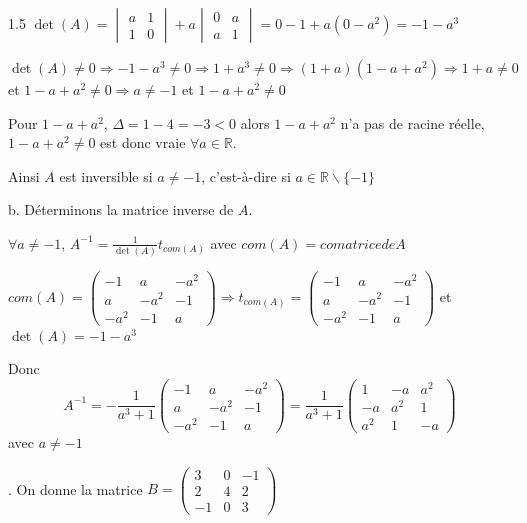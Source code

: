 \documentclass[12pt]{article}
\begin{document}
\begin{spacing}{1.5}
$\det(A)=\begin{vmatrix}
a & 1 \\ 
1 & 0
\end{vmatrix} + a\begin{vmatrix}
0 & a \\ 
a & 1
\end{vmatrix}=0-1+a(0-a^2)=-1-a^3$

$\det(A)\neq 0\Rightarrow -1-a^3\neq 0 \Rightarrow 1+a^3\neq 0 \Rightarrow (1+a)(1-a+a^2) \Rightarrow 1+a\neq 0$ et $1-a+a^2\neq 0 \Rightarrow a\neq -1$ et $1-a+a^2\neq 0$

Pour $1-a+a^2$, $\Delta=1-4=-3<0$ alors $1-a+a^2$ n'a pas de racine réelle, $1-a+a^2\neq 0$ est donc vraie $\forall a\in \mathbb{R}$.

Ainsi $A$ est inversible si $a\neq -1$, c'est-à-dire si $a\in \mathbb{R}\smallsetminus \{-1\}$


b. Déterminons la matrice inverse de $A$.


$\forall a\neq -1$, $A^{-1}=\frac{1}{\det(A)}t_{com(A)}$ avec $com(A)=comatrice de A$

$com(A)=\begin{pmatrix}
-1 & a & -a^2 \\ 
a & -a^2 & -1 \\ 
-a^2 & -1 & a
\end{pmatrix} \Rightarrow  t_{com(A)}= \begin{pmatrix}
-1 & a & -a^2 \\ 
a & -a^2 & -1 \\ 
-a^2 & -1 & a
\end{pmatrix}$ et $\det(A)=-1-a^3$

Donc \[A^{-1}=-\frac{1}{a^3+1}\begin{pmatrix}
-1 & a & -a^2 \\ 
a & -a^2 & -1 \\ 
-a^2 & -1 & a
\end{pmatrix}=\frac{1}{a^3+1}\begin{pmatrix}
1 & -a & a^2 \\ 
-a & a^2 & 1 \\ 
a^2 & 1 & -a
\end{pmatrix}\] avec $a\neq -1$

. On donne la matrice $B=\begin{pmatrix}
3 & 0 & -1 \\ 
2 & 4 & 2 \\ 
-1 & 0 & 3
\end{pmatrix}$  


\end{spacing}
\end{document}
